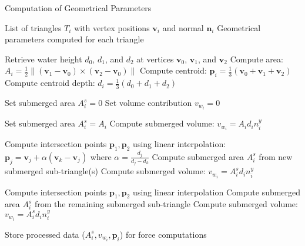 \begin{algorithm}
\caption{Computation of Geometrical Parameters}
\label{alg:geom_params}
\begin{algorithmic}[1]
\Require List of triangles $T_i$ with vertex positions $\mathbf{v}_i$ and normal $\mathbf{n}_i$
\Ensure Geometrical parameters computed for each triangle

    \State Retrieve water height $d_0$, $d_1$, and $d_2$ at vertices $\mathbf{v}_0$, $\mathbf{v}_1$, and $\mathbf{v}_2$
    \State Compute area: $A_i = \frac{1}{2} \|(\mathbf{v}_1 - \mathbf{v}_0) \times (\mathbf{v}_2 - \mathbf{v}_0)\|$
    \State Compute centroid: $\mathbf{p}_i = \frac{1}{3} (\mathbf{v}_0 + \mathbf{v}_1 + \mathbf{v}_2)$
    \State Compute centroid depth: $d_i = \frac{1}{3} (d_0 + d_1 + d_2)$
    
      
        \State Set submerged area $A_i^s = 0$
        \State Set volume contribution $v_{w_i} = 0$
        
     
        \State Set submerged area $A_i^s = A_i$
        \State Compute submerged volume: $v_{w_i} = A_i d_i n_i^y$
        
     
        \State Compute intersection points $\mathbf{p}_1, \mathbf{p}_2$ using linear interpolation:
        \State $\mathbf{p}_j = \mathbf{v}_j + \alpha (\mathbf{v}_k - \mathbf{v}_j)$ where $\alpha = \frac{d_j}{d_j - d_k}$
        \State Compute submerged area $A_i^s$ from new submerged sub-triangle(s)
        \State Compute submerged volume: $v_{w_i} = A_i^s d_i n_i^y$
        
     
        \State Compute intersection points $\mathbf{p}_1, \mathbf{p}_2$ using linear interpolation
        \State Compute submerged area $A_i^s$ from the remaining submerged sub-triangle
        \State Compute submerged volume: $v_{w_i} = A_i^s d_i n_i^y$
    \EndIf

    \State Store processed data ($A_i^s, v_{w_i}, \mathbf{p}_i$) for force computations
\EndFor

\end{algorithmic}
\end{algorithm}
